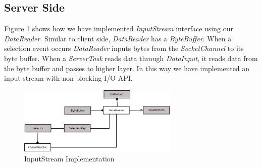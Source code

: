 \subsection{Server Side}
Figure \ref{server} shows how we have implemented \textit{InputStream} interface using our \textit{DataReader}. Similar to client side, \textit{DataReader} has a \textit{ByteBuffer}. When a selection event occurs \textit{DataReader} inputs bytes from the \textit{SocketChannel} to its byte buffer. When a \textit{ServerTask} reads data through \textit{DataInput}, it reads data from the byte buffer and passes to higher layer. In this way we have implemented an input stream with non blocking I/O API.
\begin{figure}[!t]
        \centering
        \includegraphics[width=3.0in]{server.png}
        \caption{InputStream Implementation}
        \label{server}
\end{figure}

